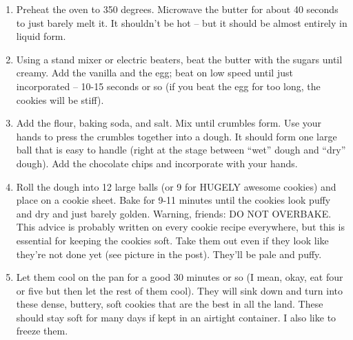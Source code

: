 \begin{enumerate}
    \item Preheat the oven to 350 degrees. Microwave the butter for about 40 seconds to just barely melt it. It shouldn’t be hot – but it should be almost entirely in liquid form.

    \item Using a stand mixer or electric beaters, beat the butter with the sugars until creamy. Add the vanilla and the egg; beat on low speed until just incorporated – 10-15 seconds or so (if you beat the egg for too long, the cookies will be stiff).

    \item Add the flour, baking soda, and salt. Mix until crumbles form. Use your hands to press the crumbles together into a dough. It should form one large ball that is easy to handle (right at the stage between “wet” dough and “dry” dough). Add the chocolate chips and incorporate with your hands.

    \item Roll the dough into 12 large balls (or 9 for HUGELY awesome cookies) and place on a cookie sheet. Bake for 9-11 minutes until the cookies look puffy and dry and just barely golden. Warning, friends: DO NOT OVERBAKE. This advice is probably written on every cookie recipe everywhere, but this is essential for keeping the cookies soft. Take them out even if they look like they’re not done yet (see picture in the post). They’ll be pale and puffy.

    \item Let them cool on the pan for a good 30 minutes or so (I mean, okay, eat four or five but then let the rest of them cool). They will sink down and turn into these dense, buttery, soft cookies that are the best in all the land. These should stay soft for many days if kept in an airtight container. I also like to freeze them.
\end{enumerate}